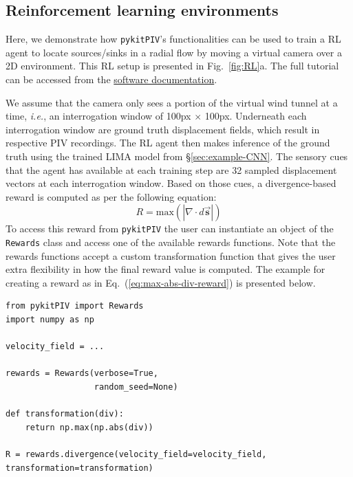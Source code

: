 \documentclass[a4paper,fleqn]{cas-dc}
\begin{document}
\subsection{Reinforcement learning environments} \label{sec:example-RL}

Here, we demonstrate how \texttt{pykitPIV}'s functionalities can be used to train a RL agent to locate sources/sinks in a radial flow by moving a virtual camera over a 2D environment. 
This RL setup is presented in Fig.~\ref{fig:RL}a. The full tutorial can be accessed from the \href{https://pykitpiv.readthedocs.com}{software documentation}.

We assume that the camera only sees a portion of the virtual wind tunnel at a time, \textit{i.e.}, an interrogation window of 100px $\times$ 100px. Underneath each interrogation window are ground truth displacement fields, which result in respective PIV recordings. The RL agent then makes inference of the ground truth using the trained LIMA model from \S\ref{sec:example-CNN}. The sensory cues that the agent has available at each training step are 32 sampled displacement vectors at each interrogation window. Based on those cues, a divergence-based reward is computed as per the following equation:
\begin{equation} \label{eq:max-abs-div-reward}
R = \text{max} ( |\nabla \cdot d\vec{\mathbf{s}} | )
\end{equation}
To access this reward from \texttt{pykitPIV} the user can instantiate an object of the \texttt{Rewards} class and access one of the available rewards functions. Note that the rewards functions accept a custom transformation function that gives the user extra flexibility in how the final reward value is computed. The example for creating a reward as in Eq.~(\ref{eq:max-abs-div-reward}) is presented below.
\lstset{language=Python}
\begin{lstlisting}
from pykitPIV import Rewards
import numpy as np

velocity_field = ...

rewards = Rewards(verbose=True,
                  random_seed=None)
                  
def transformation(div):
    return np.max(np.abs(div))
    
R = rewards.divergence(velocity_field=velocity_field,
transformation=transformation)
\end{lstlisting}
\end{document}
